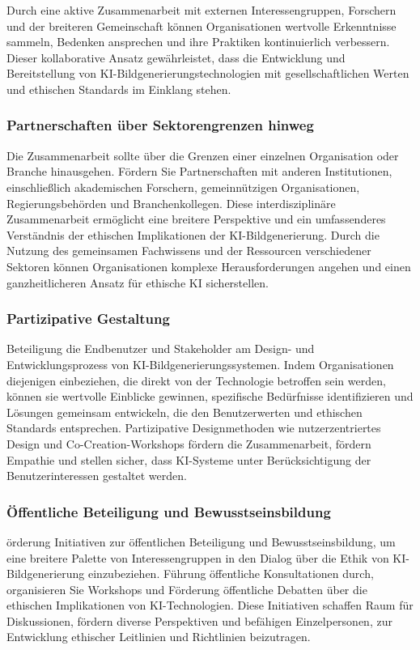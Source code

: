 \documentclass[12pt]{article}
\begin{document}
Durch eine aktive Zusammenarbeit mit externen Interessengruppen, Forschern und der breiteren Gemeinschaft können Organisationen wertvolle Erkenntnisse sammeln, Bedenken ansprechen und ihre Praktiken kontinuierlich verbessern. Dieser kollaborative Ansatz gewährleistet, dass die Entwicklung und Bereitstellung von KI-Bildgenerierungstechnologien mit gesellschaftlichen Werten und ethischen Standards im Einklang stehen.

\subsubsection{Partnerschaften über Sektorengrenzen hinweg}
Die Zusammenarbeit sollte über die Grenzen einer einzelnen Organisation oder Branche hinausgehen. Fördern Sie Partnerschaften mit anderen Institutionen, einschließlich akademischen Forschern, gemeinnützigen Organisationen, Regierungsbehörden und Branchenkollegen. Diese interdisziplinäre Zusammenarbeit ermöglicht eine breitere Perspektive und ein umfassenderes Verständnis der ethischen Implikationen der KI-Bildgenerierung. Durch die Nutzung des gemeinsamen Fachwissens und der Ressourcen verschiedener Sektoren können Organisationen komplexe Herausforderungen angehen und einen ganzheitlicheren Ansatz für ethische KI sicherstellen.

\subsubsection{Partizipative Gestaltung}
Beteiligung die Endbenutzer und Stakeholder am Design- und Entwicklungsprozess von KI-Bildgenerierungssystemen. Indem Organisationen diejenigen einbeziehen, die direkt von der Technologie betroffen sein werden, können sie wertvolle Einblicke gewinnen, spezifische Bedürfnisse identifizieren und Lösungen gemeinsam entwickeln, die den Benutzerwerten und ethischen Standards entsprechen. Partizipative Designmethoden wie nutzerzentriertes Design und Co-Creation-Workshops fördern die Zusammenarbeit, fördern Empathie und stellen sicher, dass KI-Systeme unter Berücksichtigung der Benutzerinteressen gestaltet werden.
\cite{Vogel}
\subsubsection{Öffentliche Beteiligung und Bewusstseinsbildung}
örderung Initiativen zur öffentlichen Beteiligung und Bewusstseinsbildung, um eine breitere Palette von Interessengruppen in den Dialog über die Ethik von KI-Bildgenerierung einzubeziehen. Führung öffentliche Konsultationen durch, organisieren Sie Workshops und Förderung öffentliche Debatten über die ethischen Implikationen von KI-Technologien. Diese Initiativen schaffen Raum für Diskussionen, fördern diverse Perspektiven und befähigen Einzelpersonen, zur Entwicklung ethischer Leitlinien und Richtlinien beizutragen.
\end{document}
